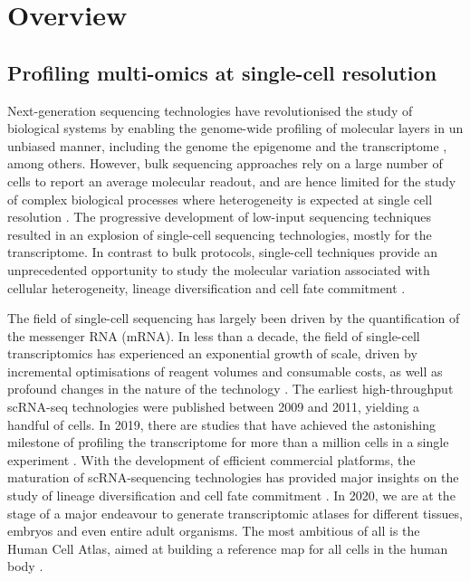 \graphicspath{{Introduction/Figs/}}

\chapter{Overview}

\section{Profiling multi-omics at single-cell resolution}

Next-generation sequencing technologies have revolutionised the study of biological systems by enabling the genome-wide profiling of molecular layers in un unbiased manner, including the genome \cite{Fleischmann1995} the epigenome \cite{Frommer1992} and the transcriptome \cite{Lister2008,Bainbridge2006,Nagalakshmi2008,Mortazavi2008}, among others. However, bulk sequencing approaches rely on a large number of cells to report an average molecular readout, and are hence limited for the study of complex biological processes where heterogeneity is expected at single cell resolution \cite{Griffiths2018,Papalexi2017,Patel2014}. The progressive development of low-input sequencing techniques resulted in an explosion of single-cell sequencing technologies, mostly for the transcriptome. In contrast to bulk protocols, single-cell techniques provide an unprecedented opportunity to study the molecular variation associated with cellular heterogeneity, lineage diversification and cell fate commitment \cite{Kolodziejczyk2015}.

The field of single-cell sequencing has largely been driven by the quantification of the messenger RNA (mRNA). In less than a decade, the field of single-cell transcriptomics has experienced an exponential growth of scale, driven by incremental optimisations of reagent volumes and consumable costs, as well as profound changes in the nature of the technology \cite{Svensson2018}. The earliest high-throughput scRNA-seq technologies were published between 2009 and 2011, yielding a handful of cells. In 2019, there are studies that have achieved the astonishing milestone of profiling the transcriptome for more than a million cells in a single experiment \cite{Cao2019}. With the development of efficient commercial platforms, the maturation of scRNA-sequencing technologies has provided major insights on the study of lineage diversification and cell fate commitment \cite{Kolodziejczyk2015,Griffiths2018,Papalexi2017,Patel2014}. In 2020, we are at the stage of a major endeavour to generate transcriptomic atlases for different tissues, embryos and even entire adult organisms. The most ambitious of all is the Human Cell Atlas, aimed at building a reference map for all cells in the human body \cite{Aviv2017}.


